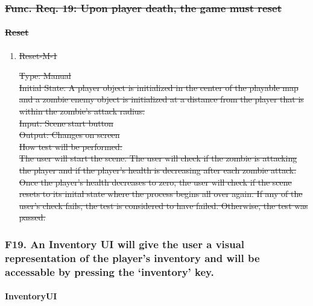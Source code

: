 \documentclass[12pt, titlepage]{article}
\DeclareRobustCommand{\hsout}[1]{\texorpdfstring{\sout{#1}}{#1}}
\begin{document}
\begin{enumerate}
\end{enumerate}

\subsubsection{\hsout{Func. Req. 19: Upon player death, the game must reset}} 

\paragraph{\hsout{Reset}}

\begin{enumerate}

\item{\sout{Reset-M-1}\\}

\sout{Type: Manual} \\
					
\sout{Initial State: A player object is initialized in the center of the playable map and a zombie enemy object is initialized at a distance from the player that is within the zombie's attack radius.}\\
					
\sout{Input: Scene start button} \\
					
\sout{Output: Changes on screen} \\
					
\sout{How test will be performed:}\\  \sout{The user will start the scene. The user will check if the zombie is attacking the player and if the player's health is decreasing after each zombie attack. Once the player's health decreases to zero, the user will check if the scene resets to its inital state where the process begins all over again. If any of the user's check fails, the test is considered to have failed. Otherwise, the test was passed.} \\

\end{enumerate}

\subsubsection{{\color{magenta} F19. An Inventory UI will give the user a visual representation of the player's inventory and will be accessable by pressing the ‘inventory’ key.}} 

\paragraph{{\color{magenta} InventoryUI}}
\end{document}

